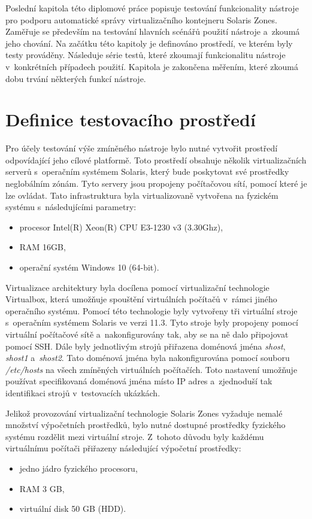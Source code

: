 Poslední kapitola této diplomové práce popisuje testování funkcionality nástroje pro podporu automatické správy virtualizačního
kontejneru Solaris Zones. Zaměřuje se především na testování
hlavních scénářů použití nástroje a~zkoumá jeho chování. Na začátku této kapitoly je definováno prostředí, ve kterém byly
testy prováděny. Následuje série testů, které zkoumají funkcionalitu nástroje v~konkrétních případech použití. Kapitola je zakončena
měřením, které zkoumá dobu trvání některých funkcí nástroje.
\section{Definice testovacího prostředí}
\label{chapter:testing:environment}
Pro účely testování výše zmíněného nástroje bylo nutné vytvořit prostředí odpovídající jeho cílové platformě. Toto prostředí
obsahuje několik virtualizačních serverů s~operačním systémem Solaris, který bude poskytovat své prostředky neglobálním zónám.
Tyto servery jsou propojeny počítačovou sítí, pomocí které je lze ovládat. Tato infrastruktura byla virtualizovaně vytvořena na 
fyzickém systému s~následujícími parametry:
\begin{itemize}
 \item procesor Intel(R) Xeon(R) CPU E3-1230 v3 (3.30Ghz),
 \item RAM 16GB,
 \item operační systém Windows 10 (64-bit).
\end{itemize}
Virtualizace architektury byla docílena pomocí virtualizační technologie Virtualbox, která umožňuje spouštění virtuálních 
počítačů v~rámci jiného operačního systému. Pomocí této technologie byly vytvořeny tři virtuální stroje s~operačním systémem
Solaris ve verzi 11.3. Tyto stroje byly propojeny pomocí virtuální počítačové sítě a~nakonfigurovány tak, aby se na ně dalo 
připojovat pomocí SSH. Dále byly jednotlivým strojů přiřazena doménová jména \textit{shost}, \textit{shost1} a~\textit{shost2}.
Tato doménová jména byla nakonfigurována pomocí souboru \textit{/etc/hosts} na všech zmíněných virtuálních počítačích. Toto
nastavení umožňuje používat specifikovaná doménová jména místo IP adres a~zjednoduší tak identifikaci strojů v~testovacích
ukázkách. 

Jelikož provozování virtualizační technologie Solaris Zones vyžaduje nemalé množství výpočetních prostředků, bylo nutné
dostupné prostředky fyzického systému rozdělit mezi virtuální stroje. Z~tohoto důvodu byly každému virtuálnímu počítači
přiřazeny následující výpočetní prostředky:
\begin{itemize}
 \item jedno jádro fyzického procesoru,
 \item RAM 3 GB,
 \item virtuální disk 50 GB (HDD).
\end{itemize}


